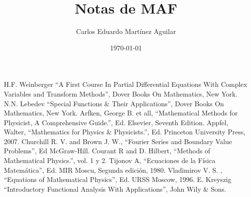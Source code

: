 \documentclass[letterpaper]{book}
\author{Carlos Eduardo Martínez Aguilar}
\date{\today}
\title{Notas de MAF}
\begin{document}
\maketitle
\tableofcontents





\begin{thebibliography}{9}

 H.F. Weinberger ``A First Course In Partial Differential Equations With Complex Variables and Transform Methods'', Dover Books On Mathematics, New York.
 N.N. Lebedev ``Special Functions \& Their Applications'', Dover Books On Mathematics, New York.
 Arfken, George B. et all, ``Mathematical Methods for Physicist, A Comprehensive Guide.'', Ed. Elsevier, Seventh Edition.
 Appfel, Walter, ``Mathematics for Physics \& Physicists.'', Ed. Princeton University Press, 2007.
 Churchill R. V. and Brown J. W., ``Fourier Series and Boundary Value Problems'', Ed McGraw-Hill.
 Courant R and D. Hilbert, ``Methods of Mathematical Physics.'', vol. 1 y 2.
 Tijonov A, ``Ecuaciones de la Física Matemática'', Ed. MIR Moscu, Segunda edición, 1980.
 Vladimirov V. S. , ``Equations of Mathematical Physics'', Ed. URSS Moscow, 1996.
 E. Kreyszig ``Introductory Functional Analysis With Applications'', John Wily \& Sons.

\end{thebibliography}
\end{document}
